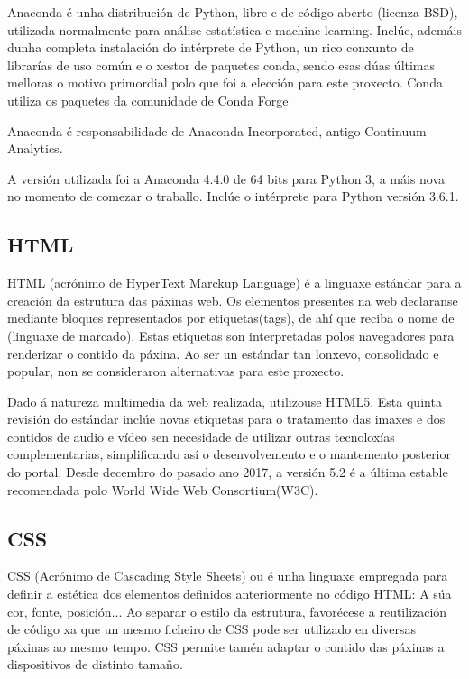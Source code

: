 Anaconda é unha distribución de Python, libre e de código aberto (licenza BSD), utilizada normalmente para análise estatística e machine learning. Inclúe, ademáis dunha completa instalación do intérprete de Python, un rico conxunto de librarías de uso común e o xestor de paquetes conda, sendo esas dúas últimas melloras o motivo primordial polo que foi a elección para este proxecto. Conda utiliza os paquetes da comunidade de Conda Forge \cite{anaconda1}

Anaconda é responsabilidade de Anaconda Incorporated, antigo Continuum Analytics.

A versión utilizada foi a Anaconda 4.4.0 de 64 bits para Python 3, a máis nova no momento de comezar o traballo. Inclúe o intérprete para Python versión 3.6.1.


\subsection{HTML}

HTML (acrónimo de HyperText Marckup Language) é a linguaxe estándar para a creación da estrutura das páxinas web. Os 
elementos presentes na web declaranse mediante bloques representados por etiquetas(tags), de ahí que reciba o nome de
 (linguaxe de marcado). Estas etiquetas son interpretadas polos navegadores para renderizar o 
contido da páxina\cite{html1}. Ao ser un estándar tan lonxevo, consolidado e popular, non se consideraron alternativas 
para este proxecto.

Dado á natureza multimedia da web realizada, utilizouse HTML5. Esta quinta revisión do estándar inclúe novas etiquetas 
para o tratamento das imaxes e dos contidos de audio e vídeo sen necesidade de utilizar outras tecnoloxías complementarias, 
simplificando así o desenvolvemento e o mantemento posterior do portal. Desde decembro do pasado ano 2017, a versión 5.2 é a última estable recomendada polo World Wide Web Consortium(W3C)\cite{html_w3c}.


\subsection{CSS}

CSS (Acrónimo de Cascading Style Sheets) ou  é unha linguaxe empregada para definir a estética dos elementos definidos anteriormente no código HTML: A súa cor, fonte, posición... Ao separar o estilo da estrutura, favorécese a reutilización de código xa que un mesmo ficheiro de CSS pode ser utilizado en diversas páxinas ao mesmo tempo. CSS permite tamén adaptar o contido das páxinas a dispositivos de distinto tamaño\cite{css_w3c}.

